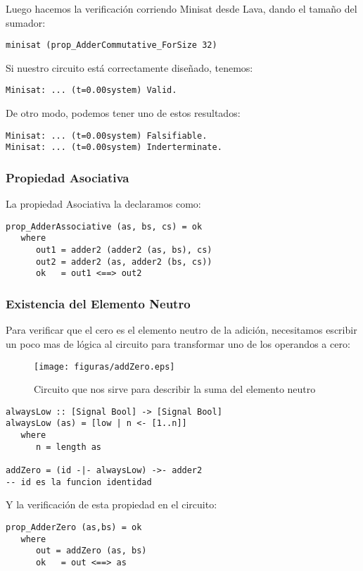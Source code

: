\noindent Luego hacemos la verificación corriendo Minisat
 desde Lava, dando el tamaño del sumador:
\begin{lstlisting}
minisat (prop_AdderCommutative_ForSize 32)
\end{lstlisting}

\noindent Si nuestro circuito está correctamente diseñado, tenemos:
{\footnotesize
\begin{verbatim}
Minisat: ... (t=0.00system) Valid.
\end{verbatim}
}

\noindent De otro modo, podemos tener uno de estos resultados:

{\footnotesize
\begin{verbatim}
Minisat: ... (t=0.00system) Falsifiable.
Minisat: ... (t=0.00system) Inderterminate.
\end{verbatim}
}

\subsubsection{Propiedad Asociativa}
\noindent La propiedad Asociativa la declaramos como:
{\footnotesize
\begin{verbatim}
prop_AdderAssociative (as, bs, cs) = ok
   where
      out1 = adder2 (adder2 (as, bs), cs)
      out2 = adder2 (as, adder2 (bs, cs))
      ok   = out1 <==> out2
\end{verbatim}
}

\subsubsection{Existencia del Elemento Neutro}
\noindent Para verificar que el cero es el elemento neutro de la adición, necesitamos escribir un poco mas de lógica al circuito para transformar uno de los operandos a cero:

\begin{figure}[h]
  \centering
\texttt{[image: figuras/addZero.eps]}
  \caption{Circuito que nos sirve para describir la suma del elemento neutro}
\end{figure}


\begin{lstlisting}
alwaysLow :: [Signal Bool] -> [Signal Bool]
alwaysLow (as) = [low | n <- [1..n]]
   where
      n = length as

addZero = (id -|- alwaysLow) ->- adder2
-- id es la funcion identidad
\end{lstlisting}
\noindent Y la verificación de esta propiedad en el circuito:
{\footnotesize
\begin{verbatim}
prop_AdderZero (as,bs) = ok
   where
      out = addZero (as, bs)
      ok   = out <==> as
\end{verbatim}
}


